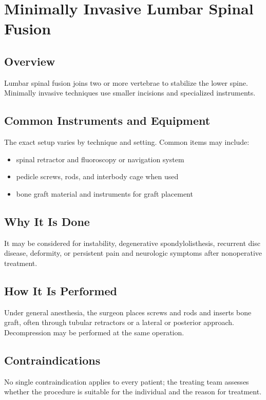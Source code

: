 \chapter{Minimally Invasive Lumbar Spinal Fusion}

\section*{Overview}
Lumbar spinal fusion joins two or more vertebrae to stabilize the lower spine. Minimally invasive techniques use smaller incisions and specialized instruments.

\section*{Common Instruments and Equipment}
The exact setup varies by technique and setting. Common items may include:
\begin{itemize}[nosep,leftmargin=*]
  \item spinal retractor and fluoroscopy or navigation system
  \item pedicle screws, rods, and interbody cage when used
  \item bone graft material and instruments for graft placement
\end{itemize}

\section*{Why It Is Done}
It may be considered for instability, degenerative spondylolisthesis, recurrent disc disease, deformity, or persistent pain and neurologic symptoms after nonoperative treatment.

\section*{How It Is Performed}
Under general anesthesia, the surgeon places screws and rods and inserts bone graft, often through tubular retractors or a lateral or posterior approach. Decompression may be performed at the same operation.

\section*{Contraindications}
No single contraindication applies to every patient; the treating team assesses whether the procedure is suitable for the individual and the reason for treatment.

